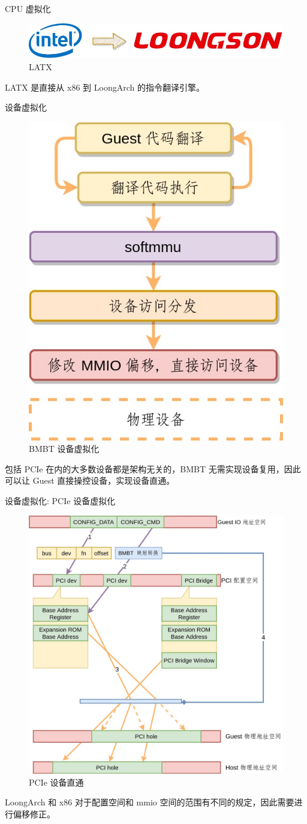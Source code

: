 \documentclass{beamer}
\begin{document}
\begin{frame}{CPU 虚拟化}
	\begin{figure}
		\includegraphics[width=\linewidth]{../paper/images/latx.jpg}
		\caption{LATX}
	\end{figure}
	LATX 是直接从 x86 到 LoongArch 的指令翻译引擎。
\end{frame}

\begin{frame}{设备虚拟化}
	\begin{figure}
		\includegraphics[width=0.3\linewidth]{../paper/images/bmbt-device.jpg}
		\caption{BMBT 设备虚拟化}
	\end{figure}
	包括 PCIe 在内的大多数设备都是架构无关的，BMBT 无需实现设备复用，因此可以让 Guest 直接操控设备，实现设备直通。
\end{frame}

\begin{frame}{设备虚拟化: PCIe 设备虚拟化}
	\begin{figure}
		\includegraphics[width=0.5\linewidth]{../paper/images/PCIe.jpg}
		\caption{PCIe 设备直通}
	\end{figure}
	LoongArch 和 x86 对于配置空间和 mmio 空间的范围有不同的规定，因此需要进行偏移修正。
\end{frame}
\end{document}
